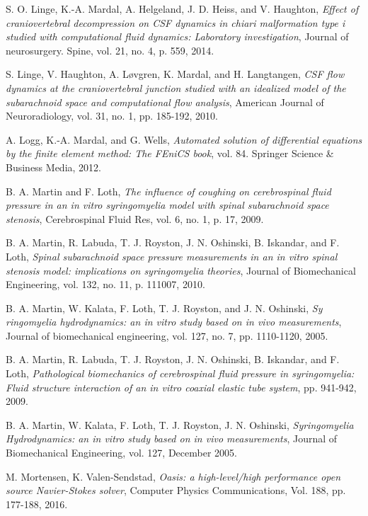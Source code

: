 \documentclass[a4paper,11pt,openright,twoside]{book}
\begin{document}
\begin{thebibliography}{100}
 S. O. Linge, K.-A. Mardal, A. Helgeland, J. D. Heiss, and V. Haughton, \emph{Effect of craniovertebral decompression on CSF dynamics in chiari malformation type i studied with computational fluid dynamics: Laboratory investigation}, Journal of neurosurgery. Spine, vol. 21, no. 4, p. 559, 2014.

 S. Linge, V. Haughton, A. Løvgren, K. Mardal, and H. Langtangen, \emph{CSF flow dynamics at the craniovertebral junction studied with an idealized model of the subarachnoid space and computational flow analysis}, American Journal of Neuroradiology, vol. 31, no. 1, pp. 185-192, 2010.


 A. Logg, K.-A. Mardal, and G. Wells, \emph{Automated solution of differential equations by the finite element method: The FEniCS book}, vol. 84. Springer Science \& Business Media, 2012.


 B. A. Martin and F. Loth, \emph{The influence of coughing on cerebrospinal fluid pressure in an in vitro syringomyelia model with spinal subarachnoid space stenosis}, Cerebrospinal Fluid Res, vol. 6, no. 1, p. 17, 2009.

 B. A. Martin, R. Labuda, T. J. Royston, J. N. Oshinski, B. Iskandar, and F. Loth, \emph{Spinal subarachnoid space pressure measurements in an in vitro spinal stenosis model: implications on syringomyelia theories}, Journal of Biomechanical Engineering, vol. 132, no. 11, p. 111007, 2010.

 B. A. Martin, W. Kalata, F. Loth, T. J. Royston, and J. N. Oshinski, \emph{Sy ringomyelia hydrodynamics: an in vitro study based on in vivo measurements}, Journal of biomechanical engineering, vol. 127, no. 7, pp. 1110-1120, 2005.

 B. A. Martin, R. Labuda, T. J. Royston, J. N. Oshinski, B. Iskandar, and F. Loth, \emph{Pathological biomechanics of cerebrospinal fluid pressure in syringomyelia: Fluid structure interaction of an in vitro coaxial elastic tube system}, pp. 941-942, 2009.

 B. A. Martin, W. Kalata, F. Loth, T. J. Royston, J. N. Oshinski, \emph{Syringomyelia Hydrodynamics: an in vitro study based on in vivo measurements}, Journal of Biomechanical Engineering, vol. 127, December 2005.

 M. Mortensen, K. Valen-Sendstad, \emph{Oasis: a high-level/high performance open source Navier-Stokes solver}, Computer Physics Communications, Vol. 188, pp. 177-188, 2016.


\end{thebibliography}
\end{document}
